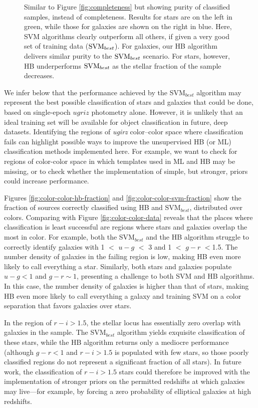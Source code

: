 \documentclass[12pt,preprint]{aastex}
\begin{document}
\begin{figure}
\centering
\caption{Similar to Figure \ref{fig:completeness} but showing purity
  of classified samples, instead of completeness. Results for stars
  are on the left in green, while those for galaxies are shown on the
  right in blue.  Here, SVM algorithms clearly outperform all others,
  if given a very good set of training data (${\rm SVM}_{best}$).  For
  galaxies, our HB algorithm delivers similar purity to the ${\rm
    SVM}_{best}$ scenario.  For stars, however, HB underperforms ${\rm
    SVM}_{best}$ as the stellar fraction of the sample decreases.}
\label{fig:purity}
\end{figure}

We infer below that the performance achieved by the SVM$_{best}$
algorithm may represent the best possible classification of stars and
galaxies that could be done, based on single-epoch $ugriz$ photometry
alone.  However, it is unlikely that an ideal training set will be
available for object classification in future, deep datasets.
Identifying the regions of {\it ugirz} color--color space where
classification fails can highlight possible ways to improve the
unsupervised HB (or ML) classification methods implemented here.  For
example, we want to check for regions of color-color space in which
templates used in ML and HB may be missing, or to check whether the
implementation of simple, but stronger, priors could increase
performance.

Figures \ref{fig:color-color-hb-fraction} and
\ref{fig:color-color-svm-fraction} show the fraction of sources
correctly classified using HB and SVM$_{best}$, distributed over
colors.  Comparing with Figure \ref{fig:color-color-data} reveals that
the places where classification is least successful are regions where
stars and galaxies overlap the most in color.  For example, both the
SVM$_{best}$ and the HB algorithm struggle to correctly identify
galaxies with 1 $<$ $u-g$ $<$ 3 and 1 $<$ $g-r$ $<$1.5.  The number
density of galaxies in the failing region is low, making HB even more
likely to call everything a star.  Similarly, both stars and galaxies
populate $u-g < 1$ and $g-r \sim 1$, presenting a challenge to both
SVM and HB algorithms.  In this case, the number density of galaxies
is higher than that of stars, making HB even more likely to call
everything a galaxy and training SVM on a color separation that favors
galaxies over stars.

In the region of $r-i>1.5$, the stellar locus has essentially zero
overlap with galaxies in the sample.  The SVM$_{best}$ algorithm
yields exquisite classification of these stars, while the HB algorithm
returns only a mediocre performance (although $g-r < 1$ and $r-i >
1.5$ is populated with few stars, so those poorly classified regions
do not represent a significant fraction of all stars).  In future
work, the classification of $r-i > 1.5$ stars could therefore be
improved with the implementation of stronger priors on the permitted
redshifts at which galaxies may live---for example, by forcing a zero
probability of elliptical galaxies at high redshifts.
\end{document}
